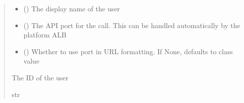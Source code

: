 \documentclass[letterpaper,10pt,english]{sphinxmanual}
\begin{document}
\begin{fulllineitems}
\begin{fulllineitems}
\begin{sphinxVerbatim}[commandchars=\\\{\}]
 
  
\end{sphinxVerbatim}
\begin{quote}\begin{description}
\begin{itemize}
\item {} 
\sphinxAtStartPar
{} () \textendash{} The display name of the user

\item {} 
\sphinxAtStartPar
{} (\sphinxstyleliteralemphasis{\sphinxupquote{ (}}\sphinxstyleliteralemphasis{\sphinxupquote{)}}) \textendash{} The API port for the call. This can be handled automatically by the platform ALB

\item {} 
\sphinxAtStartPar
{} (\sphinxstyleliteralemphasis{\sphinxupquote{ (}}\sphinxstyleliteralemphasis{\sphinxupquote{)}}) \textendash{} Whether to use port in URL formatting. If None, defaults to class value

\end{itemize}

\sphinxAtStartPar
{} \textendash{} The ID of the user

\sphinxAtStartPar
str

\end{description}\end{quote}


\end{fulllineitems}
\end{fulllineitems}
\end{document}
